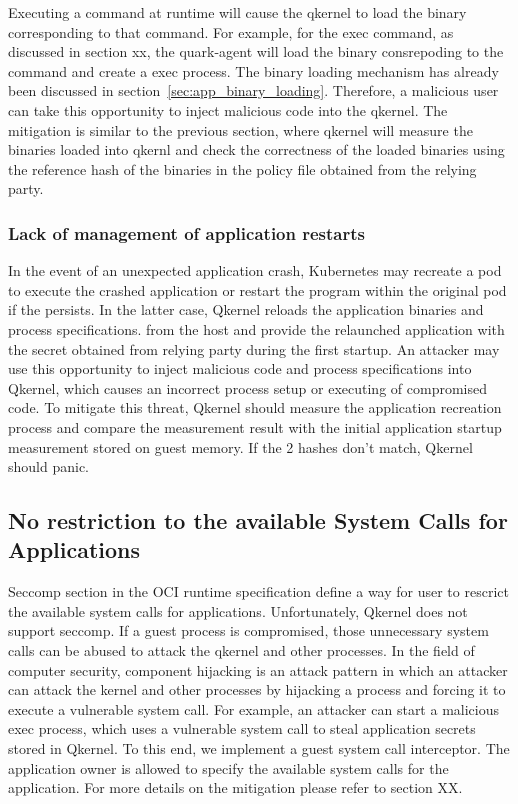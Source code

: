 Executing a command at runtime will cause the qkernel to load the binary corresponding to that command. For example, for the exec command, as discussed in section xx, the quark-agent will load the binary consrepoding to the command and create 
a exec process. The binary loading mechanism has already been discussed in section~\ref{sec:app_binary_loading}. Therefore, a malicious user can take this opportunity to inject malicious code into the qkernel. The mitigation is similar to the previous section, where qkernel 
will measure the binaries loaded into qkernl and check the correctness of the loaded binaries using the reference hash of the binaries in the policy file obtained from the relying party.


\subsubsection{Lack of management of application restarts}

In the event of an unexpected application crash, Kubernetes may recreate a pod to execute the crashed application or restart the program within the original pod if the persists\cite*{k8s}. In the latter case, Qkernel reloads the application binaries 
and process specifications. from the host and provide the relaunched application with the secret obtained from relying party during the first startup. An attacker may use this opportunity to inject malicious code and process specifications into Qkernel, 
which causes an incorrect process setup or executing of compromised code. To mitigate this threat, Qkernel should measure the application recreation process and compare the measurement result with the initial application startup measurement stored 
on guest memory. If the 2 hashes don’t match,  Qkernel should panic.

\subsection{No restriction to the available System Calls for Applications}
Seccomp section in the OCI runtime specification\cite*{oci-spec} define a way for user to rescrict the available system calls for applications.  Unfortunately, Qkernel does not support seccomp\cite*{seccomp}. If a guest process is compromised, 
those unnecessary system calls can be abused to attack the qkernel and other processes. In the field of computer security, component hijacking\cite*{DBLP:journals/corr/WuGLD16} is an attack pattern in which an attacker can attack the kernel and other processes by hijacking a process and forcing it to execute a 
vulnerable system call. For example, an attacker can start a malicious exec process, which uses a vulnerable system call to steal application secrets stored in Qkernel. To this end, we implement a guest system call interceptor. The application 
owner is allowed to specify the available system calls for the application. 
For more details on the mitigation please refer to section XX.

